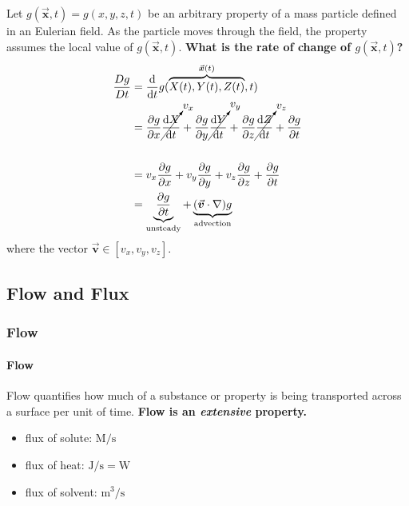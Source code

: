 \documentclass[12pt, a4paper]{article}
\numberwithin{equation}{subsection}
\begin{document}
\begin{tcolorbox}[breakable, title=\textbf{Derivation}] 
Let $g(\vec{\bm{x}}, t) = g(x, y, z, t)$ be an arbitrary property of a mass particle defined in an Eulerian field. As the particle moves through the field, the property assumes the local value of $g(\vec{\bm{x}}, t)$. \textbf{What is the rate of change of $g(\vec{\bm{x}}, t)$?}
\begin{align*} 
\begin{split}
\frac{Dg}{Dt} 
    & =\frac{\mathrm{d}}{\mathrm{d}t}g(\overbrace{X(t),Y(t),Z(t)}^{\vec{\bm{x}}(t)},t) \\
    & = \frac{\partial g}{\partial x} \cancelto{v_{x}}{\frac{\mathrm{d}X}{\mathrm{d}t}} + \frac{\partial g}{\partial y} \cancelto{v_{y}}{\frac{\mathrm{d}Y}{\mathrm{d}t}} + \frac{\partial g}{\partial z} \cancelto{v_{z}}{\frac{\mathrm{d}Z}{\mathrm{d}t}} + \frac{\partial g}{\partial t}\\\\
    & = v_{x}\frac{\partial g}{\partial x} + v_{y}\frac{\partial g}{\partial y} + v_{z}\frac{\partial g}{\partial z} + \frac{\partial g}{\partial t}\\
    & = \underbrace{\frac{\partial g}{\partial t}}_{\text{unsteady}} + \underbrace{(\vec{\bm{v}} \cdot \nabla)g}_{\text{advection}}
\end{split} 
\end{align*}
where the vector $\vec{\bm{v}} \in [v_x, v_y, v_z]$.
\end{tcolorbox}

\subsection{Flow and Flux}
\subsubsection{Flow}
\paragraph{Flow} Flow quantifies how much of a substance or property is being transported across a surface per unit of time. \textbf{Flow is an \emph{extensive} property.}

\begin{tcolorbox}[breakable, title = \textbf{Typical Units of Flows}]
    \begin{itemize}
        \item flux of solute: $\displaystyle \mathrm{M/s}$
        \item flux of heat: $\displaystyle \mathrm{J/s = W}$
        \item flux of solvent: $\displaystyle \mathrm{m^{3}/s}$
    \end{itemize}
\end{tcolorbox}
\end{document}

